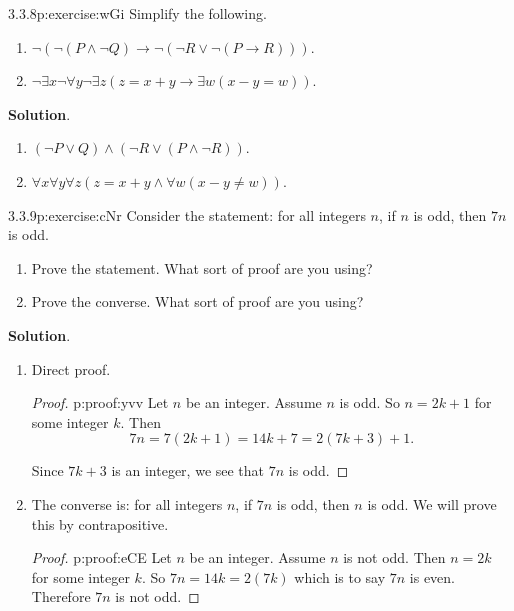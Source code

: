 \documentclass[twoside,11pt,]{book}
\newcommand{\blocktitlefont}{\relax}
\numberwithin{equation}{chapter}
\newcommand{\imp}{\rightarrow}
\begin{document}
\begin{divisionsolution}{3.3.8}{}{p:exercise:wGi}%
Simplify the following.%
\begin{enumerate}[label=(\alph*)]
\item{}\(\neg (\neg (P \wedge \neg Q) \imp \neg(\neg R \vee \neg(P \imp R)))\).%
\item{}\(\neg \exists x \neg \forall y \neg \exists z (z = x + y \imp \exists w (x - y = w))\).%
\end{enumerate}
%
\par\smallskip%
\noindent\textbf{\blocktitlefont Solution}.\quad{}%
\begin{enumerate}[label=(\alph*)]
\item{}\((\neg P \vee Q) \wedge (\neg R \vee (P \wedge \neg R))\).%
\item{}\(\forall x \forall y \forall z (z = x+y \wedge \forall w (x-y \ne w))\).%
\end{enumerate}
%
\end{divisionsolution}%
\begin{divisionsolution}{3.3.9}{}{p:exercise:cNr}%
Consider the statement: for all integers \(n\), if \(n\) is odd, then \(7n\) is odd.%
\begin{enumerate}[label=(\alph*)]
\item{}Prove the statement. What sort of proof are you using?%
\item{}Prove the converse. What sort of proof are you using?%
\end{enumerate}
%
\par\smallskip%
\noindent\textbf{\blocktitlefont Solution}.\quad{}%
\begin{enumerate}[label=(\alph*)]
\item{}Direct proof. \begin{proof}{}{p:proof:yvv}
Let \(n\) be an integer. Assume \(n\) is odd. So \(n = 2k+1\) for some integer \(k\). Then%
\begin{equation*}
7n = 7(2k+1) = 14k + 7 = 2(7k +3) + 1\text{.}
\end{equation*}
%
\par
Since \(7k + 3\) is an integer, we see that \(7n\) is odd.%
\end{proof}
%
\item{}The converse is: for all integers \(n\), if \(7n\) is odd, then \(n\) is odd. We will prove this by contrapositive. \begin{proof}{}{p:proof:eCE}
Let \(n\) be an integer. Assume \(n\) is not odd. Then \(n = 2k\) for some integer \(k\). So \(7n = 14k = 2(7k)\) which is to say \(7n\) is even. Therefore \(7n\) is not odd.%
\end{proof}
%
\end{enumerate}
%
\end{divisionsolution}%
\end{document}

